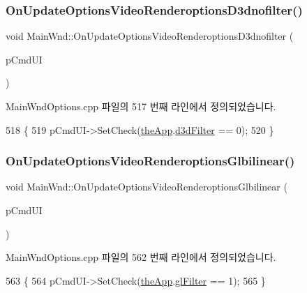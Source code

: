 \subsubsection{\texorpdfstring{On\+Update\+Options\+Video\+Renderoptions\+D3dnofilter()}{OnUpdateOptionsVideoRenderoptionsD3dnofilter()}}
{\footnotesize\ttfamily void Main\+Wnd\+::\+On\+Update\+Options\+Video\+Renderoptions\+D3dnofilter (\begin{DoxyParamCaption}\item[{C\+Cmd\+UI $\ast$}]{p\+Cmd\+UI }\end{DoxyParamCaption})\hspace{0.3cm}{\ttfamily [protected]}}



Main\+Wnd\+Options.\+cpp 파일의 517 번째 라인에서 정의되었습니다.


\begin{DoxyCode}
518 \{
519   pCmdUI->SetCheck(\mbox{\hyperlink{_v_b_a_8cpp_a8095a9d06b37a7efe3723f3218ad8fb3}{theApp}}.\mbox{\hyperlink{class_v_b_a_a8563e53b73a28a011e656f6fc8a4e5ff}{d3dFilter}} == 0);
520 \}
\end{DoxyCode}
\mbox{\label{class_main_wnd_a164bd7358a8e4bab78e3b9378914e533}} 
\subsubsection{\texorpdfstring{On\+Update\+Options\+Video\+Renderoptions\+Glbilinear()}{OnUpdateOptionsVideoRenderoptionsGlbilinear()}}
{\footnotesize\ttfamily void Main\+Wnd\+::\+On\+Update\+Options\+Video\+Renderoptions\+Glbilinear (\begin{DoxyParamCaption}\item[{C\+Cmd\+UI $\ast$}]{p\+Cmd\+UI }\end{DoxyParamCaption})\hspace{0.3cm}{\ttfamily [protected]}}



Main\+Wnd\+Options.\+cpp 파일의 562 번째 라인에서 정의되었습니다.


\begin{DoxyCode}
563 \{
564   pCmdUI->SetCheck(\mbox{\hyperlink{_v_b_a_8cpp_a8095a9d06b37a7efe3723f3218ad8fb3}{theApp}}.\mbox{\hyperlink{class_v_b_a_a7861cd60864163f310ae87f746eba9e6}{glFilter}} == 1);
565 \}
\end{DoxyCode}
\mbox{\label{class_main_wnd_a919aee70c540401f59a34852550fe698}} 
